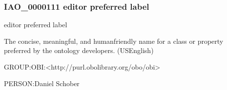\documentclass[letterpaper,10pt,english]{sphinxmanual}
\begin{document}
\sphinxAtStartPar
{}
\begin{quote}

\ignorespaces \end{quote}


\subsubsection{IAO\_0000111 \sphinxhyphen{} editor preferred label}
\label{\detokenize{doc-IAO_0000111:iao-0000111-editor-preferred-label}}\label{\detokenize{doc-IAO_0000111:index-0}}\label{\detokenize{doc-IAO_0000111::doc}}
\begin{sphinxShadowBox}

\sphinxAtStartPar
editor preferred label
\end{sphinxShadowBox}

\begin{sphinxShadowBox}

\sphinxAtStartPar
The concise, meaningful, and human\sphinxhyphen{}friendly name for a class or property preferred by the ontology developers. (US\sphinxhyphen{}English)
\end{sphinxShadowBox}

\begin{sphinxShadowBox}

\sphinxAtStartPar
GROUP:OBI:\textless{}http://purl.obolibrary.org/obo/obi\textgreater{}
\end{sphinxShadowBox}

\begin{sphinxShadowBox}

\sphinxAtStartPar
PERSON:Daniel Schober
\end{sphinxShadowBox}
\begin{quote}

\ignorespaces \end{quote}
\end{document}
